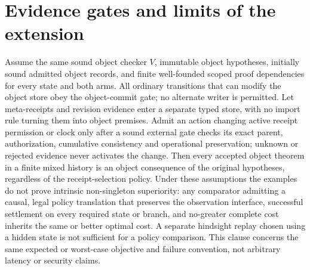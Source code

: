 \documentclass[11pt,letterpaper]{article}
\begin{document}
\section{Evidence gates and limits of the extension}
\begin{proposition}\label{prop:boundary}
Assume the same sound object checker $V$, immutable object hypotheses, initially sound admitted object records, and finite well-founded scoped proof dependencies for every state and both arms. All ordinary transitions that can modify the object store obey the object-commit gate; no alternate writer is permitted. Let meta-receipts and revision evidence enter a separate typed store, with no import rule turning them into object premises. Admit an action changing active receipt permission or clock only after a sound external gate checks its exact parent, authorization, cumulative consistency and operational preservation; unknown or rejected evidence never activates the change. Then every accepted object theorem in a finite mixed history is an object consequence of the original hypotheses, regardless of the receipt-selection policy. Under these assumptions the examples do not prove intrinsic non-singleton superiority: any comparator admitting a causal, legal policy translation that preserves the observation interface, successful settlement on every required state or branch, and no-greater complete cost inherits the same or better optimal cost. A separate hindsight replay chosen using a hidden state is not sufficient for a policy comparison. This clause concerns the same expected or worst-case objective and failure convention, not arbitrary latency or security claims.
\end{proposition}
\end{document}
